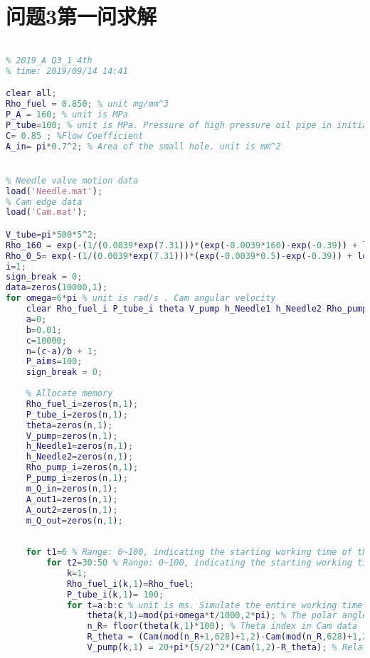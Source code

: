 \documentclass[withoutpreface,bwprint]{cumcmthesis} %
\begin{document}
\begin{appendices}
\begin{lstlisting}[language=matlab]
\end{lstlisting}

\section{问题3第一问求解} 
\begin{lstlisting}[language=matlab]

% 2019_A Q3_1_4th
% time: 2019/09/14 14:41

clear all;
Rho_fuel = 0.850; % unit mg/mm^3
P_A = 160; % unit is MPa
P_tube=100; % unit is MPa. Pressure of high pressure oil pipe in initial state
C= 0.85 ; %Flow Coefficient
A_in= pi*0.7^2; % Area of the small hole. unit is mm^2


% Needle valve motion data
load('Needle.mat');
% Cam edge data
load('Cam.mat');

V_tube=pi*500*5^2;
Rho_160 = exp(-(1/(0.0039*exp(7.31)))*(exp(-0.0039*160)-exp(-0.39)) + log(0.85)); % Fuel density at a pressure of 160 MPa
Rho_0_5= exp(-(1/(0.0039*exp(7.31)))*(exp(-0.0039*0.5)-exp(-0.39)) + log(0.85)); % Fuel density at a pressure of 0.5 MPa
i=1;
sign_break = 0;
data=zeros(10000,1);
for omega=6*pi % unit is rad/s . Cam angular velocity
    clear Rho_fuel_i P_tube_i theta V_pump h_Needle1 h_Needle2 Rho_pump_i P_pump_i m_Q_in A_out1 A_out2 m_Q_out
    a=0;
    b=0.01;
    c=10000;
    n=(c-a)/b + 1;
    P_aims=100;
    sign_break = 0;
    
    % Allocate memory
    Rho_fuel_i=zeros(n,1);
    P_tube_i=zeros(n,1);
    theta=zeros(n,1);
    V_pump=zeros(n,1);
    h_Needle1=zeros(n,1);
    h_Needle2=zeros(n,1);
    Rho_pump_i=zeros(n,1);
    P_pump_i=zeros(n,1);
    m_Q_in=zeros(n,1);
    A_out1=zeros(n,1);
    A_out2=zeros(n,1);
    m_Q_out=zeros(n,1);
    
    
    for t1=6 % Range: 0~100, indicating the starting working time of the injector during the period T=100ms.
        for t2=30:50 % Range: 0~100, indicating the starting working time of the injector during the period T=100ms.
            k=1;
            Rho_fuel_i(k,1)=Rho_fuel;
            P_tube_i(k,1)= 100;
            for t=a:b:c % unit is ms. Simulate the entire working time frame
                theta(k,1)=mod(pi+omega*t/1000,2*pi); % The polar angle of the current moment cam. (unit is rad)
                n_R= floor(theta(k,1)*100); % Theta index in Cam data
                R_theta = (Cam(mod(n_R+1,628)+1,2)-Cam(mod(n_R,628)+1,2))*(theta(k,1)*100-n_R)+Cam(mod(n_R,628)+1,2) ; % The diameter of the current moment cam. (unit is mm)
                V_pump(k,1) = 20+pi*(5/2)^2*(Cam(1,2)-R_theta); % Relationship between oil pump volume and pole diameter.


\end{lstlisting}
\end{appendices}
\end{document}
